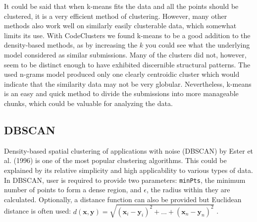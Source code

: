 It could be said that when k-means fits the data and all the points should be clustered, it is a very efficient method of clustering. However, many other methods also work well on similarly easily clusterable data, which somewhat limits its use. With CodeClusters we found k-means to be a good addition to the density-based methods, as by increasing the $k$ you could see what the underlying model considered as similar submissions. Many of the clusters did not, however, seem to be distinct enough to have exhibited discernible structural patterns. The used n-grams model produced only one clearly centroidic cluster which would indicate that the similarity data may not be very globular. Nevertheless, k-means is an easy and quick method to divide the submissions into more manageable chunks, which could be valuable for analyzing the data.

\subsection{DBSCAN}
\label{ssec:dbscan}

Density-based spatial clustering of applications with noise (DBSCAN) by Ester et al. (1996) \cite{dbscan-1996} is one of the most popular clustering algorithms. This could be explained by its relative simplicity and high applicability to various types of data. In DBSCAN, user is required to provide two parameters: \texttt{minPts}, the minimum number of points to form a dense region, and $\epsilon$, the radius within they are calculated. Optionally, a distance function can also be provided but Euclidean distance is often used: $d(\mathbf{x}, \mathbf{y})=\sqrt{(\mathbf{x}_i - \mathbf{y}_i)^2 + ... + (\mathbf{x}_n - \mathbf{y}_n)^2}$ \cite{dbscan-1996, data-mining-2011}.

